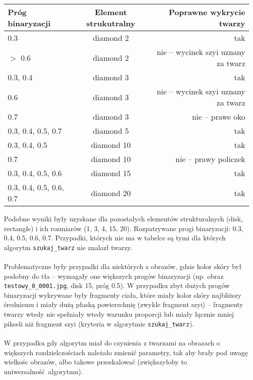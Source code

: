 \documentclass[a4paper, 12pt, titlepage]{article}
\begin{document}
        \begin{center}
            \begin{tabular}{|l|c|r|}
                \hline
                Próg binaryzacji & Element strukutralny & Poprawne wykrycie twarzy 
                \\ \hline
                0.3 & diamond 2 & tak \\ \hline
                $>$ 0.6 & diamond 2 & nie -- wycinek szyi uznany za twarz\\ \hline
                0.3, 0.4 & diamond 3 & tak  \\ \hline
                0.6 & diamond 3 & nie -- wycinek szyi uznany za twarz\\ \hline
                0.7 & diamond 3 & nie -- prawe oko\\ \hline
                0.3, 0.4, 0.5, 0.7 & diamond 5 & tak \\ \hline
                0.3, 0.4, 0.5 & diamond 10 & tak \\ \hline
                0.7 & diamond 10 & nie -- prawy policzek \\ \hline
                0.3, 0.4, 0.5, 0.6 & diamond 15 & tak \\ \hline
                0.3, 0.4, 0.5, 0.6, 0.7 & diamond 20 & tak \\ \hline
            \end{tabular}
        \end{center}
        Podobne wyniki były uzyskane dla pozostałych elementów strukturalnych
        (disk, rectangle) i ich rozmiarów (1, 3, 4, 15, 20). Rozpatrywane progi
        binaryzacji: 0.3, 0.4, 0.5, 0.6, 0.7. Przypadki, których nie ma w tabelce
        są tymi dla których algorytm \texttt{szukaj\_twarz} nie znalazł twarzy.
        \\ \\
        Problematyczne były przypadki dla niektórych z obrazów, gdzie kolor skóry
        był podobny do tła -- wymagały one większych progów binaryzacji (np.
        obraz \texttt{testowy\_0\_0001.jpg}, disk 15, próg 0.5). W przypadku zbyt
        dużych progów binaryzacji wykrywane były fragmenty ciała, które miały 
        kolor skóry najbliższy średniemu i miały dużą płaską powierzchnię (zwykle 
        fragment szyi) -- fragmenty twarzy wtedy nie spełniały wtedy warunku 
        proporcji lub miały łącznie mniej pikseli niż fragment szyi (kryteria w 
        algorytmie \texttt{szukaj\_twarz}).
        \\ \\
        W przypadku gdy algorytm miał do czynienia z twarzami na obrazach o
        większych rozdzielczościach należało zmienić parametry, tak aby brały pod 
        uwagę wielkośc obrazów, albo takowe przeskalować (zwiększyłoby to
        uniwersalność algorytmu).
\end{document}
